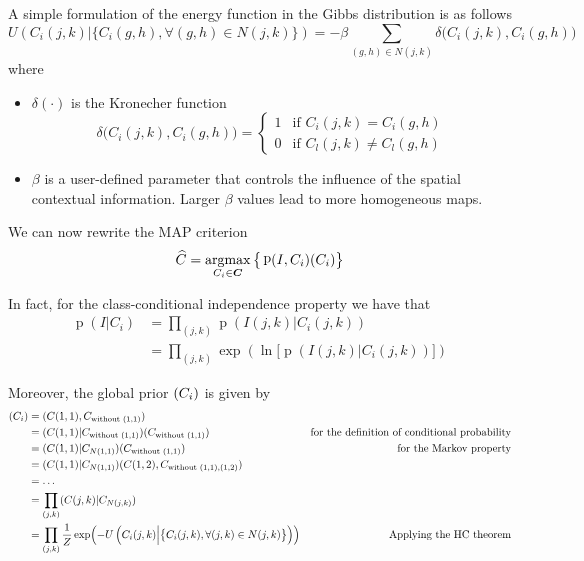 \documentclass[oneside,onecolumn]{report}
\DeclareMathOperator*{\argmax}{argmax}
\DeclareMathOperator*{\pdf}{p}
\let\P\relax
\DeclareMathOperator*{\P}{P}
\begin{document}
A simple formulation of the energy function in the Gibbs distribution is as follows
$$ U \left( C_i(j, k) \Big| \big\{ C_i(g, h), \forall (g, h) \in N(j, k) \big\} \right) = -\beta \sum_{(g,h) \in N(j, k)} \delta \big(C_i(j, k), C_i(g, h) \big) $$
where
\begin{itemize}
    \item $\delta(\cdot)$ is the Kronecher function
    $$ \delta \big(C_i(j, k), C_i(g, h) \big) = \begin{cases}
        1 & \text{if } C_i(j, k) = C_i(g, h) \\
        0 & \text{if } C_l(j, k) \neq C_l(g, h)
    \end{cases} $$
    \item $\beta$ is a user-defined parameter that controls the influence of the spatial contextual information. Larger $\beta$ values lead to more homogeneous maps.
\end{itemize}

We can now rewrite the MAP criterion
$$ \widehat C = \argmax_{C_i \in \bm C} \big\{ \pdf(I, C_i) \P(C_i)  \big\} $$

In fact, for the class-conditional independence property we have that
\begin{align*}
    \pdf(I | C_i)
    &= \prod_{(j, k)} \pdf(I(j, k) | C_i(j, k)) \\
    &= \prod_{(j, k)} \exp(\ln \big[ \pdf(I(j, k) | C_i(j, k)) \big] )
\end{align*}

Moreover, the global prior $\P(C_i)$ is given by
\begin{align*}
    \P(C_i)
    &= \P(C(1, 1), C_{\text{without } (1, 1)}) \\
    &= \P(C(1, 1) | C_{\text{without } (1, 1)}) \P(C_{\text{without } (1, 1)}) & \text{for the definition of conditional probability} \\
    &= \P(C(1, 1) | C_{N(1, 1)}) \P(C_{\text{without } (1, 1)}) & \text{for the Markov property} \\
    &= \P(C(1, 1) | C_{N(1, 1)}) \P(C(1, 2), C_{\text{without } (1, 1), (1, 2)}) \\
    &= \dots \\
    &= \prod_{(j, k)} \P(C(j, k) | C_{N(j, k)}) \\
    &= \prod_{(j, k)} \frac{1}{Z} \exp(-U \left( C_i(j, k) \Big| \big\{ C_i(j, k), \forall (j, k) \in N(j, k) \big\} \right)) & \text{Applying the HC theorem}
\end{align*}
\end{document}
